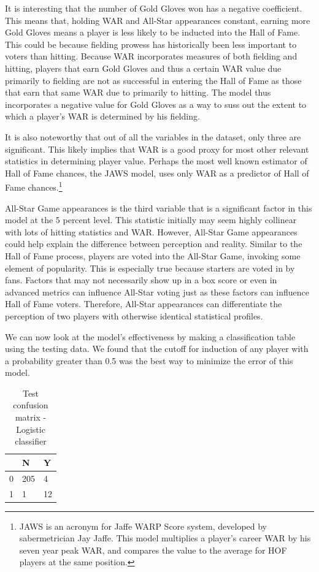 \documentclass[letterpaper, 10 pt, conference]{ieeeconf}
\begin{document}
It is interesting that the number of Gold Gloves won has a negative coefficient. This means that, holding WAR and All-Star appearances constant, earning more Gold Gloves means a player is less likely to be inducted into the Hall of Fame. This could be because fielding prowess has historically been less important to voters than hitting. Because WAR incorporates measures of both fielding and hitting, players that earn Gold Gloves and thus a certain WAR value due primarily to fielding are not as successful in entering the Hall of Fame as those that earn that same WAR due to primarily to hitting. The model thus incorporates a negative value for Gold Gloves as a way to suss out the extent to which a player's WAR is determined by his fielding.

It is also noteworthy that out of all the variables in the dataset, only three are significant. This likely implies that WAR is a good proxy for most other relevant statistics in determining player value. Perhaps the most well known estimator of Hall of Fame chances, the JAWS model, uses only WAR as a predictor of Hall of Fame chances.\footnote{JAWS is an acronym for Jaffe WARP Score system, developed by sabermetrician Jay Jaffe. This model multiplies a player's career WAR by his seven year peak WAR, and compares the value to the average for HOF players at the same position.} 

All-Star Game appearances is the third variable that is a significant factor in this model at the 5 percent level. This statistic initially may seem highly collinear with lots of hitting statistics and WAR. However, All-Star Game appearances could help explain the difference between perception and reality. Similar to the Hall of Fame process, players are voted into the All-Star Game, invoking some element of popularity. This is especially true because starters are voted in by fans. Factors that may not necessarily show up in a box score or even in advanced metrics can influence All-Star voting just as these factors can influence Hall of Fame voters. Therefore, All-Star appearances can differentiate the perception of two players with otherwise identical statistical profiles.

We can now look at the model's effectiveness by making a classification table using the testing data. We found that the cutoff for induction of any player with a probability greater than 0.5 was the best way to minimize the error of this model.

\begin{table}[ht]
\centering
\caption{Test confusion matrix - Logistic classifier}
\begin{tabular}{l|l|l|}
\cline{2-3}
                        & N   & Y  \\ \hline
\multicolumn{1}{|l|}{0} & 205 & 4  \\ \hline
\multicolumn{1}{|l|}{1} & 1   & 12 \\ \hline
\end{tabular}
\end{table}
\end{document}
